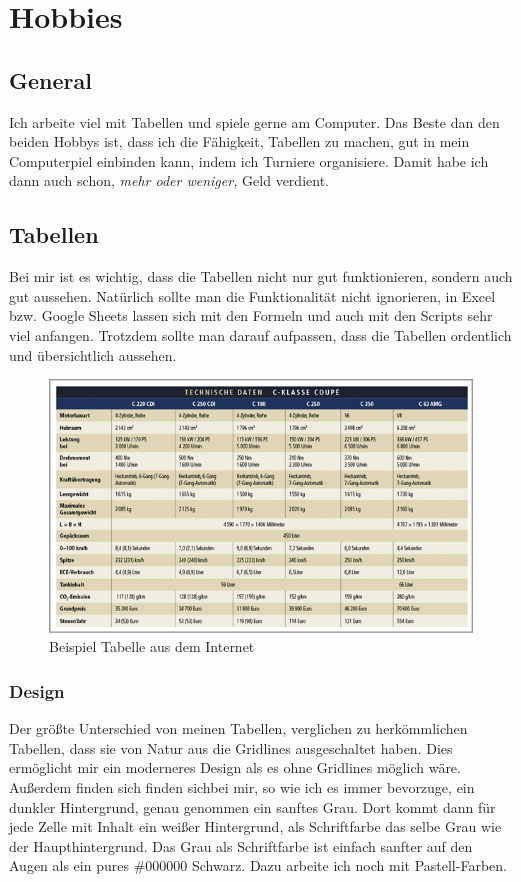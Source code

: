 \documentclass[11pt]{article}
\begin{document}
\setlength{\parindent}{0pt}

\tableofcontents
\newpage

\section{Hobbies}

\subsection{General}
Ich arbeite viel mit Tabellen und spiele gerne am Computer. 
Das Beste dan den beiden Hobbys ist, dass ich die Fähigkeit, Tabellen zu machen, gut in mein Computerpiel einbinden kann, indem ich Turniere organisiere.
Damit habe ich dann auch schon, \textit{mehr oder weniger,} Geld verdient.

\subsection{Tabellen}
Bei mir ist es wichtig, dass die Tabellen nicht nur gut funktionieren, sondern auch gut aussehen.
Natürlich sollte man die Funktionalität nicht ignorieren, in Excel bzw. Google Sheets lassen sich mit den Formeln und auch mit den Scripts sehr viel anfangen.
Trotzdem sollte man darauf aufpassen, dass die Tabellen ordentlich und übersichtlich aussehen.

\begin{figure}[hbtp]
\centering
\includegraphics[width=.75\textwidth]{Bilder/ExampleSheet.png}
\caption{Beispiel Tabelle aus dem Internet}
\end{figure}


\subsubsection*{Design}
Der größte Unterschied von meinen Tabellen, verglichen zu herkömmlichen Tabellen, dass sie von Natur aus die Gridlines ausgeschaltet haben.
Dies ermöglicht mir ein moderneres Design als es ohne Gridlines möglich wäre.
Außerdem finden sich finden sichbei mir, so wie ich es immer bevorzuge, ein dunkler Hintergrund, genau genommen ein sanftes Grau.
Dort kommt dann für jede Zelle mit Inhalt ein weißer Hintergrund, als Schriftfarbe das selbe Grau wie der Haupthintergrund.
Das Grau als Schriftfarbe ist einfach sanfter auf den Augen als ein pures \#000000 Schwarz.
Dazu arbeite ich noch mit Pastell-Farben.

\newpage
\listoffigures
\end{document}
